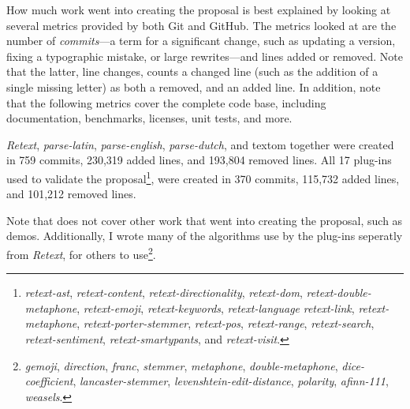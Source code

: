How much work went into creating the proposal is best explained by looking
  at several metrics provided by both Git and GitHub.
The metrics looked at are the number of \emph{commits}---a term for a
  significant change, such as updating a version, fixing a typographic
  mistake, or large rewrites---and lines added or removed.
Note that the latter, line changes, counts a changed line (such as the
  addition of a single missing letter) as both a removed, and an added line.
In addition, note that the following metrics cover the complete code base,
  including documentation, benchmarks, licenses, unit tests, and more.

\emph{Retext}, \emph{parse-latin}, \emph{parse-english}, \emph{parse-dutch},
  and \gls{textom} together were created in 759 commits, 230,319 added lines,
  and 193,804 removed lines.
All 17 plug-ins used to validate the proposal\footnote{\emph{retext-ast},
    \emph{retext-content},
    \emph{retext-directionality}, \emph{retext-dom},
    \emph{retext-double-metaphone}, \emph{retext-emoji},
    \emph{retext-keywords}, \emph{retext-language}
    \emph{retext-link}, \emph{retext-metaphone},
    \emph{retext-porter-stemmer}, \emph{retext-pos}, \emph{retext-range},
    \emph{retext-search}, \emph{retext-sentiment}, \emph{retext-smartypants},
    and \emph{retext-visit}.},
  were created in 370 commits, 115,732 added lines, and 101,212 removed lines.

Note that does not cover other work that went into creating the proposal,
  such as demos.
Additionally, I wrote many of the algorithms use by the plug-ins seperatly
  from \emph{Retext}, for others to use\footnote{\emph{gemoji},
    \emph{direction}, \emph{franc}, \emph{stemmer}, \emph{metaphone},
    \emph{double-metaphone}, \emph{dice-coefficient},
    \emph{lancaster-stemmer}, \emph{levenshtein-edit-distance},
    \emph{polarity}, \emph{afinn-111}, \emph{weasels}.
  }.

\endgroup
